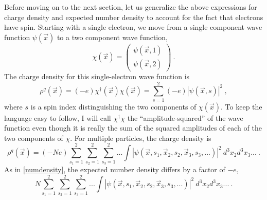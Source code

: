 \documentclass[12pt,onecolumn,secnumarabic,amsmath,amssymb,balancelastpage,nofootinbib]{article}
\begin{document}
Before moving on to the next section, let us generalize the above expressions for charge density and expected number density to account for the fact that electrons have spin.  Starting with a single electron, we move from a single component wave function $\psi(\vec{x})$ to a two component wave function,
\begin{equation}
\chi(\vec{x})=\left(
\begin{matrix}
\psi(\vec{x},1) \\
\psi(\vec{x},2)
\end{matrix}
\right)
\ .
\end{equation}
The charge density for this single-electron wave function is
\begin{equation}
\rho^q(\vec{x})=(- e) \chi^{\dagger}(\vec{x})\chi(\vec{x}) =\sum_{s=1}^{2}(- e) |\psi(\vec{x},s)|^2
\ ,
\label{chargedensitypauli}
\end{equation}
where $s$ is a spin index distinguishing the two components of $\chi(\vec{x})$.  To keep the language easy to follow, I will call $\chi^{\dagger}\chi$ the ``amplitude-squared'' of the wave function even though it is really the sum of the squared amplitudes of each of the two components of $\chi$.  For multiple particles, the charge density is
\begin{equation}
\rho^q(\vec{x})=(-N e) \sum_{s_1=1}^{2}\sum_{s_2=1}^{2}\sum_{s_3=1}^{2}...\int{|\psi(\vec{x},s_1,\vec{x}_2,s_2,\vec{x}_3,s_3,...)|^2\ d^3 x_2 d^3 x_3 ...}
\ .
\label{totalchargedensitypauli}
\end{equation}
As in \eqref{numdensity}, the expected number density differs by a factor of $-e$,
\begin{equation}
N \sum_{s_1=1}^{2}\sum_{s_2=1}^{2}\sum_{s_3=1}^{2}...\int{|\psi(\vec{x},s_1,\vec{x}_2,s_2,\vec{x}_3,s_3,...)|^2\ d^3 x_2 d^3 x_3 ...}
\ .
\label{numdensitypauli}
\end{equation}
\end{document}
